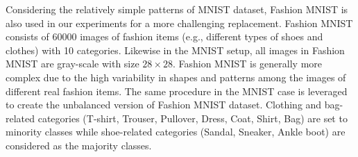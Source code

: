 \begin{description}[leftmargin=0pt]
    \item[Unbalanced Fashion MNIST dataset] Considering the relatively simple patterns of MNIST dataset, Fashion MNIST \cite{xiaoFashionMNISTNovelImage2017} is also used in our experiments for a more challenging replacement. Fashion MNIST consists of 60000 images of fashion items (e.g., different types of shoes and clothes) with 10 categories. Likewise in the MNIST setup, all images in Fashion MNIST are gray-scale with size $28\times 28$. Fashion MNIST is generally more complex due to the high variability in shapes and patterns among the images of different real fashion items. The same procedure in the MNIST case is leveraged to create the unbalanced version of Fashion MNIST dataset. Clothing and bag-related categories (T-shirt, Trouser, Pullover, Dress, Coat, Shirt, Bag) are set to minority classes while shoe-related categories (Sandal, Sneaker, Ankle boot) are considered as the majority classes. 
\end{description}




